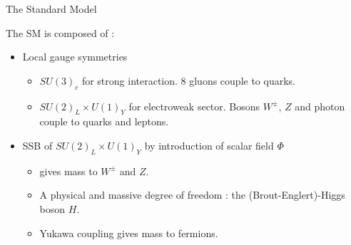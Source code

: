 \begin{frame}{The Standard Model}
  
  The SM is composed of :
  
  \begin{itemize}
  \item Local gauge symmetries
    \begin{itemize}
    \item $SU(3)_c$ for strong interaction. 8 gluons couple to quarks.
    \item $SU(2)_L\times U(1)_Y$ for electroweak sector. Bosons $W^\pm$, $Z$ and photon couple to quarks and leptons.
    \end{itemize}
    \vfill
  \item SSB of $SU(2)_L\times U(1)_Y$ by introduction of scalar field $\Phi$
    \begin{itemize}
    \item gives mass to $W^\pm$ and $Z$.
    \item A physical and massive degree of freedom : the (Brout-Englert)-Higgs boson $H$.
    \item Yukawa coupling gives mass to fermions.
    \end{itemize}
  \end{itemize}
\end{frame}
